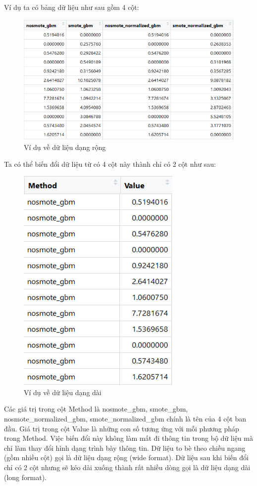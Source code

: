 \documentclass[]{tufte-book}
\begin{document}
Ví dụ ta có bảng dữ liệu như sau gồm 4 cột:

\begin{figure}
\centering
\includegraphics{figures/02_05.png}
\caption{Ví dụ về dữ liệu dạng rộng}
\end{figure}

Ta có thể biến đổi dữ liệu từ có 4 cột này thành chỉ có 2 cột như sau:

\begin{figure}
\centering
\includegraphics{figures/02_06.png}
\caption{Ví dụ về dữ liệu dạng dài}
\end{figure}

Các giá trị trong cột Method là nosmote\_gbm, smote\_gbm, nosmote\_normalized\_gbm, smote\_normalized\_gbm chính là tên của 4 cột ban đầu. Giá trị trong cột Value là những con số tương ứng với mỗi phương pháp trong Method. Việc biến đổi này không làm mất đi thông tin trong bộ dữ liệu mà chỉ làm thay đổi hình dạng trình bày thông tin. Dữ liệu to bè theo chiều ngang (gồm nhiều cột) gọi là dữ liệu dạng rộng (wide format). Dữ liệu sau khi biến đổi chỉ có 2 cột nhưng sẽ kéo dài xuống thành rất nhiều dòng gọi là dữ liệu dạng dài (long format).
\end{document}
